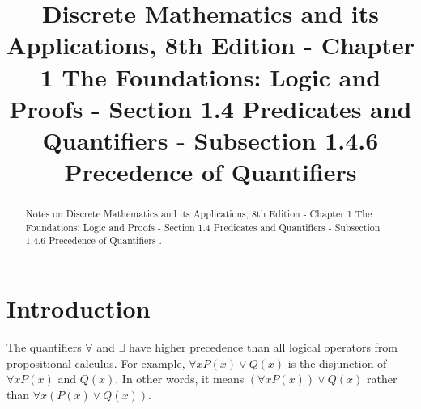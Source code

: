 \documentclass{Axon}
\title{Discrete Mathematics and its Applications, 8th Edition - Chapter 1 The Foundations: Logic and Proofs - Section 1.4 Predicates and Quantifiers - Subsection 1.4.6 Precedence of Quantifiers}
\begin{document}
\maketitle
\makeauthor
\begin{abstract}
Notes on Discrete Mathematics and its Applications, 8th Edition - Chapter 1 The Foundations: Logic and Proofs - Section 1.4 Predicates and Quantifiers - Subsection 1.4.6 Precedence of Quantifiers \cite{Rosen}.
\end{abstract}
\section{Introduction}
The quantifiers \(\forall\) and \(\exists\) have higher precedence than all logical operators from propositional calculus. For example, \(\forall x P(x) \lor Q(x)\) is the disjunction of \(\forall x P(x)\) and \(Q(x)\). In other words, it means \((\forall x P(x)) \lor Q(x)\) rather than \(\forall x (P(x) \lor Q(x))\).

\printbibliography
\end{document}
